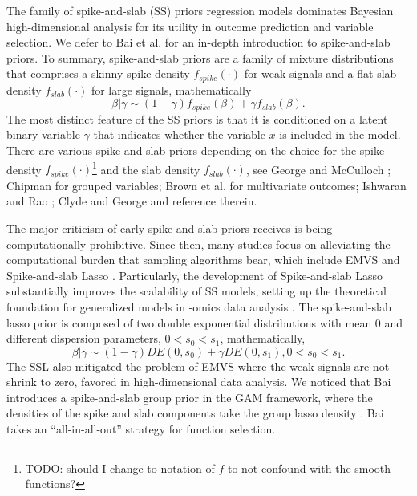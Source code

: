 \documentclass[AMA,STIX1COL,]{WileyNJD-v2}
\begin{document}
The family of spike-and-slab (SS) priors regression models dominates
Bayesian high-dimensional analysis for its utility in outcome prediction
and variable selection. We defer to Bai et al. \citep{Bai2021Review} for
an in-depth introduction to spike-and-slab priors. To summary,
spike-and-slab priors are a family of mixture distributions that
comprises a skinny spike density \(f_{spike}(\cdot)\) for weak signals
and a flat slab density \(f_{slab}(\cdot)\) for large signals,
mathematically \[
 \beta|\gamma \sim (1-\gamma)f_{spike}(\beta) + \gamma f_{slab}(\beta).
\] The most distinct feature of the SS priors is that it is conditioned
on a latent binary variable \(\gamma\) that indicates whether the
variable \(x\) is included in the model. There are various
spike-and-slab priors depending on the choice for the spike density
\(f_{spike}(\cdot)\)\footnote{TODO: should I change to notation of \(f\)
  to not confound with the smooth functions?} and the slab density
\(f_{slab}(\cdot)\), see George and McCulloch
\citep{George1993, George1997}; Chipman \citep{Chipman1996} for grouped
variables; Brown et al. \citep{Brown1998} for multivariate outcomes;
Ishwaran and Rao \citep{Ishwaran2005}; Clyde and George
\citep{Clyde2004} and reference therein.

The major criticism of early spike-and-slab priors receives is being
computationally prohibitive. \citep{Bai2021Review} Since then, many
studies focus on alleviating the computational burden that sampling
algorithms bear, which include EMVS \citep{Rockova2014a} and
Spike-and-slab Lasso \citep{Rockova2018b, Rockova2018}. Particularly,
the development of Spike-and-slab Lasso substantially improves the
scalability of SS models, setting up the theoretical foundation for
generalized models in -omics data analysis
\citep{Tang2017a, Tang2017, Tang2018, Tang2019}. The spike-and-slab
lasso prior is composed of two double exponential distributions with
mean 0 and different dispersion parameters, \(0 < s_0 < s_1\),
mathematically, \begin{equation} \label{eq:ssl}
\beta | \gamma \sim (1-\gamma)DE(0, s_0) + \gamma DE(0, s_1), 0 < s_0 < s_1.
\end{equation} The SSL also mitigated the problem of EMVS where the weak
signals are not shrink to zero, favored in high-dimensional data
analysis. We noticed that Bai \citep{Bai2021} introduces a
spike-and-slab group prior in the GAM framework, where the densities of
the spike and slab components take the group lasso density
\citep{Xu2015}. Bai \citep{Bai2021} takes an ``all-in-all-out'' strategy
for function selection.
\end{document}
